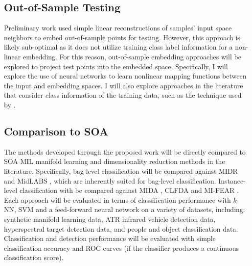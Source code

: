 \subsection{Out-of-Sample Testing}
Preliminary work used simple linear reconstructions of  samples' input space neighbors to embed out-of-sample points for testing.  However, this approach is likely sub-optimal as it does not utilize training class label information for a non-linear embedding.  For this reason, out-of-sample embedding approaches will be explored to project test points into the embedded space.  Specifically, I will explore the use of neural networks to learn nonlinear mapping functions between the input and embedding spaces.  I will also explore  approaches in the literature that consider class information of the training data, such as the technique used by  \cite{Vural2016OutOfSampleSupManifoldLearning}. 

\subsection{Comparison to SOA}

The methods developed through the proposed work will be directly compared to SOA MIL manifold learning and dimensionality reduction methods in the literature.  Specifically, bag-level classification will be compared against MIDR \citep{Sun2010MIDR} and MidLABS \citep{Ping2010MILDRMaxMargin}, which are inherently suited for bag-level classification.  Instance-level classification with be compared against MIDA \citep{Chai2014MIDA}, CLFDA \citep{Kim2010LocalDRMIL} and MI-FEAR \citep{Latham2015MIFeatureRankingThesis}.  Each approach will be evaluated in terms of classification performance with $k$-NN, SVM and a feed-forward neural network on a variety of datasets, including: synthetic manifold learning data, ATR infrared vehicle detection data, hyperspectral target detection data, and people and object classification data.  Classification and detection performance will be evaluated with simple classification accuracy and ROC curves (if the classifier produces a continuous classification score).

